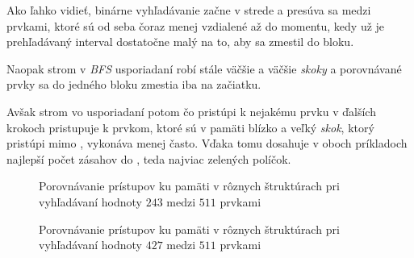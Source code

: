 Ako ľahko vidieť, binárne vyhľadávanie začne v strede a presúva sa medzi prvkami, ktoré sú od seba  čoraz menej vzdialené až do momentu, kedy už je prehľadávaný interval dostatočne malý na to, aby sa zmestil do bloku.

Naopak strom v \emph{BFS} usporiadaní robí stále väčšie a väčšie \emph{skoky} a porovnávané prvky sa do jedného bloku zmestia iba na začiatku.

Avšak strom vo  usporiadaní potom čo pristúpi k nejakému prvku v ďalších krokoch pristupuje k prvkom, ktoré sú v pamäti blízko a veľký \emph{skok}, ktorý pristúpi mimo \cache, vykonáva menej často. Vďaka tomu dosahuje v oboch príkladoch najlepší počet zásahov do \cache, teda najviac zelených políčok.

%


\begin{sidewaysfigure}
    \centering
    \caption[Porovnávanie prístupov ku pamäti pri vyhľadávaní hodnoty $243$]{Porovnávanie prístupov ku pamäti v rôznych štruktúrach pri vyhľadávaní hodnoty $243$ medzi $511$ prvkami}
    \label{fig:search_comparison1}

    \vspace*{2cm}
        
    \caption[Porovnávanie prístupov ku pamäti pri vyhľadávaní hodnoty $427$]{Porovnávanie prístupov ku pamäti v rôznych štruktúrach pri vyhľadávaní hodnoty $427$ medzi $511$ prvkami}
    \label{fig:search_comparison2}
\end{sidewaysfigure}

